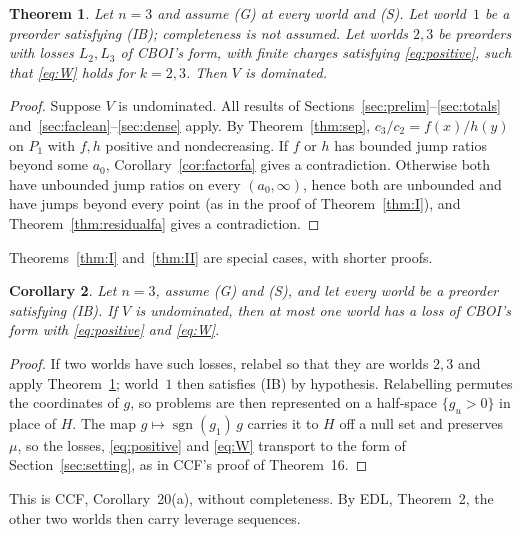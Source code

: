 \documentclass[11pt]{article}
\newtheorem{theorem}{Theorem}
\newtheorem{corollary}[theorem]{Corollary}
\theoremstyle{definition}\newtheorem{definition}[theorem]{Definition}
\theoremstyle{remark}\newtheorem{remark}[theorem]{Remark}
\begin{document}
\begin{theorem}\label{thm:main}
Let $n=3$ and assume (G) at every world and (S). Let world~$1$ be a preorder
satisfying (IB); completeness is not assumed. Let worlds $2,3$ be preorders
with losses $L_2,L_3$ of CBOI's form, with finite charges satisfying
\eqref{eq:positive}, such that \eqref{eq:W} holds for $k=2,3$. Then $V$ is
dominated.
\end{theorem}
\begin{proof}
Suppose $V$ is undominated. All results of
Sections~\ref{sec:prelim}--\ref{sec:totals} and~\ref{sec:faclean}--\ref{sec:dense}
apply. By Theorem~\ref{thm:sep}, $c_3/c_2=f(x)/h(y)$ on $P_1$ with $f,h$
positive and nondecreasing. If $f$ or $h$ has bounded jump ratios beyond some
$a_0$, Corollary~\ref{cor:factorfa} gives a contradiction. Otherwise both
have unbounded jump ratios on every $(a_0,\infty)$, hence both are unbounded
and have jumps beyond every point (as in the proof of
Theorem~\ref{thm:I}), and
Theorem~\ref{thm:residualfa} gives a contradiction.
\end{proof}

Theorems~\ref{thm:I} and~\ref{thm:II} are special cases, with shorter proofs.

\begin{corollary}\label{cor:atmostone}
Let $n=3$, assume (G) and (S), and let every world be a preorder satisfying
(IB). If $V$ is undominated, then at most one world has a loss of CBOI's form
with \eqref{eq:positive} and \eqref{eq:W}.
\end{corollary}
\begin{proof}
If two worlds have such losses, relabel so that they are worlds $2,3$ and
apply Theorem~\ref{thm:main}; world~$1$ then satisfies (IB) by hypothesis.
Relabelling permutes the coordinates of $g$, so problems are then
represented on a half-space $\{g_u>0\}$ in place of $H$. The map
$g\mapsto\operatorname{sgn}(g_1)\,g$ carries it to $H$ off a null set and
preserves $\mu$, so the losses, \eqref{eq:positive} and \eqref{eq:W}
transport to the form of Section~\ref{sec:setting}, as in CCF's proof of
Theorem~16.
\end{proof}

This is CCF, Corollary~20(a), without completeness. By EDL, Theorem~2, the
other two worlds then carry leverage sequences.
\end{document}
